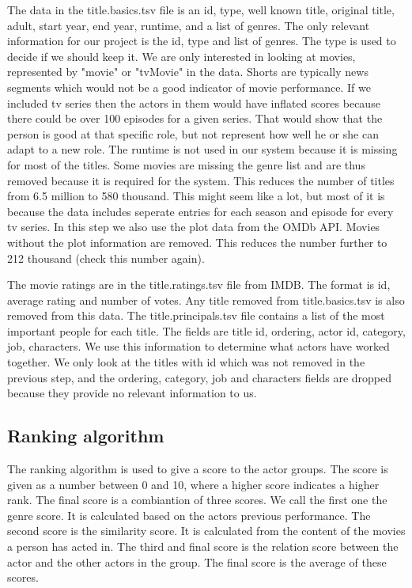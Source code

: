 The data in the title.basics.tsv file is an id,	type, well known title,	original title,	adult, start year, end year, runtime, and a list of genres. The only relevant information for our project is the id, type and list of genres. The type is used to decide if we should keep it. We are only interested in looking at movies, represented by "movie" or "tvMovie" in the data. Shorts are typically news segments which would not be a good indicator of movie performance. If we included tv series then the actors in them would have inflated scores because there could be over 100 episodes for a given series. That would show that the person is good at that specific role, but not represent how well he or she can adapt to a new role. The runtime is not used in our system because it is missing for most of the titles. Some movies are missing the genre list and are thus removed because it is required for the system. This reduces the number of titles from 6.5 million to 580 thousand. This might seem like a lot, but most of it is because the data includes seperate entries for each season and episode for every tv series. In this step we also use the plot data from the OMDb API. Movies without the plot information are removed. This reduces the number further to 212 thousand (check this number again).

The movie ratings are in the title.ratings.tsv file from IMDB. The format is id, average rating and number of votes. Any title removed from title.basics.tsv is also removed from this data. The title.principals.tsv file contains a list of the most important people for each title. The fields are title id, ordering, actor id, category, job, characters. We use this information to determine what actors have worked together. We only look at the titles with id which was not removed in the previous step, and the ordering, category, job and characters fields are dropped because they provide no relevant information to us.

\subsection{Ranking algorithm}
The ranking algorithm is used to give a score to the actor groups. The score is given as a number between 0 and 10, where a higher score indicates a higher rank. The final score is a combiantion of three scores. We call the first one the genre score. It is calculated based on the actors previous performance. The second score is the similarity score. It is calculated from the content of the movies a person has acted in. The third and final score is the relation score between the actor and the other actors in the group. The final score is the average of these scores.

